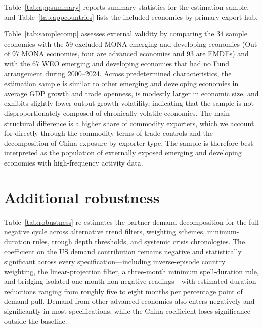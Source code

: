 \documentclass[12pt, a4paper]{article}
\begin{document}
Table~\ref{tab:appsummary} reports summary statistics for the estimation sample, and Table~\ref{tab:appcountries} lists the included economies by primary export hub.




Table~\ref{tab:samplecomp} assesses external validity by comparing the 34 sample economies with the 59 excluded MONA emerging and developing economies (Out of 97 MONA economies, four are advanced economies and 93 are EMDEs) and with the 67 WEO emerging and developing economies that had no Fund arrangement during 2000--2024. Across predetermined characteristics, the estimation sample is similar to other emerging and developing economies in average GDP growth and trade openness, is modestly larger in economic size, and exhibits slightly lower output growth volatility, indicating that the sample is not disproportionately composed of chronically volatile economies. The main structural difference is a higher share of commodity exporters, which we account for directly through the commodity terms-of-trade controls and the decomposition of China exposure by exporter type. The sample is therefore best interpreted as the population of externally exposed emerging and developing economies with high-frequency activity data.



\section{Additional robustness}\label{app:robust}

Table~\ref{tab:robustness} re-estimates the partner-demand decomposition for the full negative cycle across alternative trend filters, weighting schemes, minimum-duration rules, trough depth thresholds, and systemic crisis chronologies. The coefficient on the US demand contribution remains negative and statistically significant across every specification---including inverse-episode country weighting, the \citet{hamilton2018} linear-projection filter, a three-month minimum spell-duration rule, and bridging isolated one-month non-negative readings---with estimated duration reductions ranging from roughly five to eight months per percentage point of demand pull. Demand from other advanced economies also enters negatively and significantly in most specifications, while the China coefficient loses significance outside the baseline.
\end{document}
